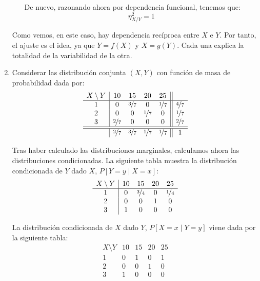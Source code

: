\begin{ejercicio}
\begin{enumerate}
\begin{itemize}
            De nuevo, razonando ahora por dependencia funcional, tenemos que:
            \begin{equation*}
                \eta^2_{X/Y} = 1
            \end{equation*}
        \end{itemize}

        Como vemos, en este caso, hay dependencia recíproca entre $X$ e $Y$. Por tanto,
        el ajuste es el idea, ya que $Y=f(X)$ y $X=g(Y)$.
        Cada una explica la totalidad de la variabilidad de la otra.


        \item Considerar las distribución conjunta $(X,Y)$ con función de masa de probabilidad dada por:
        \begin{equation*}
            \begin{array}{c|cccc||c}
                X\setminus Y & 10 & 15 & 20 & 25 &\\
                \hline
                1 & 0 & \nicefrac{3}{7} & 0 & \nicefrac{1}{7} & \nicefrac{4}{7}\\
                2 & 0 & 0 & \nicefrac{1}{7} & 0 & \nicefrac{1}{7}\\
                3 & \nicefrac{2}{7} & 0 & 0 & 0 & \nicefrac{2}{7}\\
                \hline \hline
                & \nicefrac{2}{7} & \nicefrac{3}{7} & \nicefrac{1}{7} & \nicefrac{1}{7} & 1
            \end{array}
        \end{equation*}

        Tras haber calculado las distribuciones marginales, calculamos ahora las distribuciones condicionadas.
        La siguiente tabla muestra la distribución condicionada de $Y$ dado $X$, $P[Y = y\mid X = x]$:
        \begin{equation*}
            \begin{array}{c|cccc}
                X\setminus Y & 10 & 15 & 20 & 25\\
                \hline
                1 & 0 & \nicefrac{3}{4} & 0 & \nicefrac{1}{4}\\
                2 & 0 & 0 & 1 & 0\\
                3 & 1 & 0 & 0 & 0
            \end{array}
        \end{equation*}

        La distribución condicionada de $X$ dado $Y$, $P[X = x\mid Y = y]$ viene dada por la siguiente tabla:
        \begin{equation*}
            \begin{array}{c|cccc}
                X\setminus Y & 10 & 15 & 20 & 25\\
                \hline
                1 & 0 & 1 & 0 & 1\\
                2 & 0 & 0 & 1 & 0\\
                3 & 1 & 0 & 0 & 0
            \end{array}
        \end{equation*}


\end{enumerate}
\end{ejercicio}
